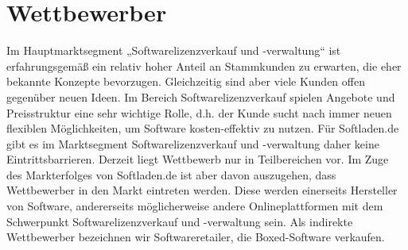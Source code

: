 \section{Wettbewerber}
Im Hauptmarktsegment „Softwarelizenzverkauf und -verwaltung“ ist erfahrungsgemäß ein relativ hoher Anteil an Stammkunden zu erwarten, die eher bekannte Konzepte bevorzugen. Gleichzeitig sind aber viele Kunden offen gegenüber neuen Ideen. Im Bereich Softwarelizenzverkauf spielen Angebote und Preisstruktur eine sehr wichtige Rolle, d.h. der Kunde sucht nach immer neuen flexiblen Möglichkeiten, um Software kosten-effektiv zu nutzen. Für Softladen.de gibt es im Marktsegment Softwarelizenzverkauf und -verwaltung daher keine Eintrittsbarrieren. Derzeit liegt Wettbewerb nur in Teilbereichen vor. Im Zuge des Markterfolges von Softladen.de ist aber davon auszugehen, dass Wettbewerber in den Markt eintreten werden. Diese werden einerseits Hersteller von Software, andererseits möglicherweise andere Onlineplattformen mit dem Schwerpunkt Softwarelizenzverkauf und -verwaltung  sein. Als indirekte Wettbewerber bezeichnen wir Softwareretailer, die Boxed-Software verkaufen.

